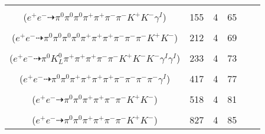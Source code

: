 \documentclass[landscape]{article}
\newcounter{rownumbers}
\newcommand\rn{\stepcounter{rownumbers}\arabic{rownumbers}}
\newcommand{\EOL}{\\} %
\newcommand{\topoTags}[1]{#1} %
\begin{document}
\begin{longtable}{clcccc}
\rn & \makecell[l]{ $ 
e^{+} e^{-} \rightarrow \pi^{0} \pi^{0} \pi^{+} \pi^{-} \omega K^{+} K^{-} \gamma^{I} ,
\omega \rightarrow \pi^{0} \pi^{+} \pi^{-} 
$ \\ ($
e^{+} e^{-} \dashrightarrow \pi^{0} \pi^{0} \pi^{0} \pi^{+} \pi^{+} \pi^{-} \pi^{-} K^{+} K^{-} \gamma^{I} 
$) } & \topoTags{155 & }4 & 65 \EOL

\rn & \makecell[l]{ $ 
e^{+} e^{-} \rightarrow \pi^{0} \pi^{0} \pi^{+} \pi^{-} \pi^{-} \rho^{+} \omega K^{+} K^{-} ,
\rho^{+} \rightarrow \pi^{0} \pi^{+} ,
\omega \rightarrow \pi^{0} \pi^{+} \pi^{-} 
$ \\ ($
e^{+} e^{-} \dashrightarrow \pi^{0} \pi^{0} \pi^{0} \pi^{0} \pi^{+} \pi^{+} \pi^{+} \pi^{-} \pi^{-} \pi^{-} K^{+} K^{-} 
$) } & \topoTags{212 & }4 & 69 \EOL

\rn & \makecell[l]{ $ 
e^{+} e^{-} \rightarrow \pi^{-} \rho^{+} K^{*} \bar{K}^{*} K^{-} K^{*+} \gamma^{I} \gamma^{I} ,
\rho^{+} \rightarrow \pi^{0} \pi^{+} ,
K^{*} \rightarrow \pi^{-} K^{+} ,
\bar{K}^{*} \rightarrow \pi^{+} K^{-} ,
K^{*+} \rightarrow \pi^{+} K^{0} ,
K^{0} \rightarrow K_{L}^{0} 
$ \\ ($
e^{+} e^{-} \dashrightarrow \pi^{0} K_{L}^{0} \pi^{+} \pi^{+} \pi^{+} \pi^{-} \pi^{-} K^{+} K^{-} K^{-} \gamma^{I} \gamma^{I} 
$) } & \topoTags{233 & }4 & 73 \EOL

\rn & \makecell[l]{ $ 
e^{+} e^{-} \rightarrow \pi^{0} \rho^{0} \pi^{+} \pi^{+} \pi^{-} \pi^{-} \omega \gamma^{I} ,
\rho^{0} \rightarrow \pi^{+} \pi^{-} ,
\omega \rightarrow \pi^{0} \pi^{+} \pi^{-} 
$ \\ ($
e^{+} e^{-} \dashrightarrow \pi^{0} \pi^{0} \pi^{+} \pi^{+} \pi^{+} \pi^{+} \pi^{-} \pi^{-} \pi^{-} \pi^{-} \gamma^{I} 
$) } & \topoTags{417 & }4 & 77 \EOL

\rn & \makecell[l]{ $ 
e^{+} e^{-} \rightarrow \pi^{0} \pi^{0} \pi^{+} \pi^{+} \pi^{-} \pi^{-} K^{+} K^{-} 
$ \\ ($
e^{+} e^{-} \dashrightarrow \pi^{0} \pi^{0} \pi^{+} \pi^{+} \pi^{-} \pi^{-} K^{+} K^{-} 
$) } & \topoTags{518 & }4 & 81 \EOL

\rn & \makecell[l]{ $ 
e^{+} e^{-} \rightarrow \pi^{+} \pi^{-} \rho^{+} \rho^{-} K^{+} K^{-} ,
\rho^{+} \rightarrow \pi^{0} \pi^{+} ,
\rho^{-} \rightarrow \pi^{0} \pi^{-} 
$ \\ ($
e^{+} e^{-} \dashrightarrow \pi^{0} \pi^{0} \pi^{+} \pi^{+} \pi^{-} \pi^{-} K^{+} K^{-} 
$) } & \topoTags{827 & }4 & 85 \EOL


\end{longtable}
\end{document}
